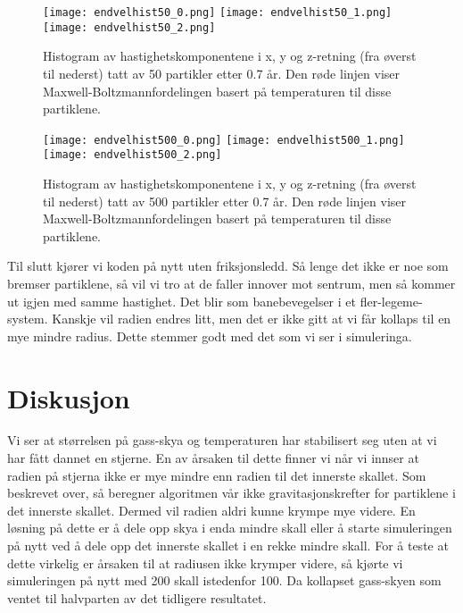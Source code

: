 \documentclass[reprint,english,notitlepage]{revtex4-1}  %
\begin{document}
\begin{figure}[htbp]
\texttt{[image: endvelhist50\_0.png]}
\texttt{[image: endvelhist50\_1.png]}
\texttt{[image: endvelhist50\_2.png]}
\caption{Histogram av hastighetskomponentene i x, y og z-retning (fra øverst til nederst) tatt av 50 partikler etter 0.7 år. Den røde linjen viser Maxwell-Boltzmannfordelingen basert på temperaturen til disse partiklene.\label{fig:boltzmann2}} 
\end{figure}

\begin{figure}[htbp]
\texttt{[image: endvelhist500\_0.png]}
\texttt{[image: endvelhist500\_1.png]}
\texttt{[image: endvelhist500\_2.png]}
\caption{Histogram av hastighetskomponentene i x, y og z-retning (fra øverst til nederst) tatt av 500 partikler etter 0.7 år. Den røde linjen viser Maxwell-Boltzmannfordelingen basert på temperaturen til disse partiklene.\label{fig:boltzmann3}} 
\end{figure}


Til slutt kjører vi koden på nytt uten friksjonsledd. Så lenge det ikke er noe som bremser partiklene, så vil vi tro at de faller innover mot sentrum, men så kommer ut igjen med samme hastighet. Det blir som banebevegelser i et fler-legeme-system. Kanskje vil radien endres litt, men det er ikke gitt at vi får kollaps til en mye mindre radius. Dette stemmer godt med det som vi ser i simuleringa.



\section{Diskusjon}

Vi ser at størrelsen på gass-skya og temperaturen har stabilisert seg uten at vi har fått dannet en stjerne. En av årsaken til dette finner vi når vi innser at radien på stjerna ikke er mye mindre enn radien til det innerste skallet. Som beskrevet over, så beregner algoritmen vår ikke gravitasjonskrefter for partiklene i det innerste skallet. Dermed vil radien aldri kunne krympe mye videre. En løsning på dette er å dele opp skya i enda mindre skall eller å starte simuleringen på nytt ved å dele opp det innerste skallet i en rekke mindre skall.  For å teste at dette virkelig er årsaken til at radiusen ikke krymper videre, så kjørte vi simuleringen på nytt med 200 skall istedenfor 100. Da kollapset gass-skyen som ventet til halvparten av det tidligere resultatet.
\end{document}
